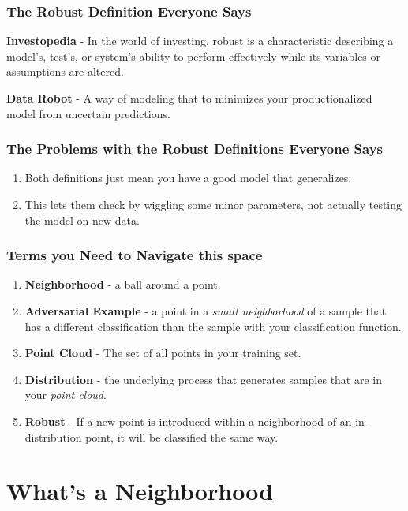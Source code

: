 \documentclass{beamer}
\begin{document}
\begin{frame}
    \frametitle{The Robust Definition Everyone Says}
    \begin{definition}
        \textbf{Investopedia} - In the world of investing, robust is a characteristic describing a model's, test's, or system's ability to perform effectively while its variables or assumptions are altered.
    \end{definition}
    \begin{definition}
        \textbf{Data Robot} - A way of modeling that to minimizes your productionalized model from uncertain predictions.
    \end{definition}
\end{frame}

\begin{frame}
    \frametitle{The Problems with the Robust Definitions Everyone Says}
    \begin{enumerate}
        \item Both definitions just mean you have a good model that generalizes.
        \item This lets them check by wiggling some minor parameters, not actually testing the model on new data.
    \end{enumerate}
\end{frame}

\begin{frame}
    \frametitle{Terms you Need to Navigate this space}
    \begin{enumerate}
        \item \textbf{Neighborhood} - a ball around a point.
        \item \textbf{Adversarial Example} - a point in a \textit{small neighborhood} of a sample that has a different classification than the sample with your classification function.
        \item \textbf{Point Cloud} - The set of all points in your training set. 
        \item \textbf{Distribution} - the underlying process that generates samples that are in your \textit{point cloud}.
        \item \textbf{Robust} - If a new point is introduced within a neighborhood of an in-distribution point, it will be classified the same way.
    \end{enumerate}
\end{frame}

\section{What's a Neighborhood}
\end{document}
